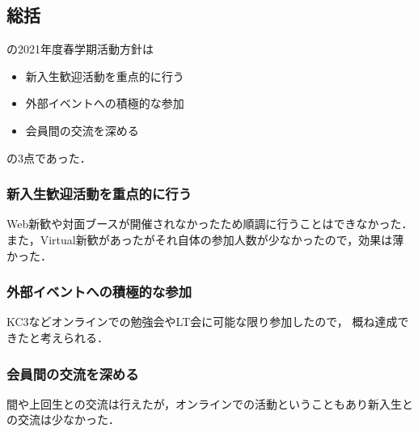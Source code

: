 \subsection*{\secondGrade{}総括}


\secondGrade{}の2021年度春学期活動方針は
\begin{itemize}
    \item 新入生歓迎活動を重点的に行う
    \item 外部イベントへの積極的な参加
    \item 会員間の交流を深める
\end{itemize}
の3点であった．

\subsubsection*{ 新入生歓迎活動を重点的に行う}
Web新歓や対面ブースが開催されなかったため順調に行うことはできなかった．
また，Virtual新歓があったがそれ自体の参加人数が少なかったので，効果は薄かった．

\subsubsection*{外部イベントへの積極的な参加}
KC3などオンラインでの勉強会やLT会に可能な限り参加したので，
概ね達成できたと考えられる．

\subsubsection*{会員間の交流を深める}
\secondGrade{}間や上回生との交流は行えたが，オンラインでの活動ということもあり新入生との交流は少なかった．
